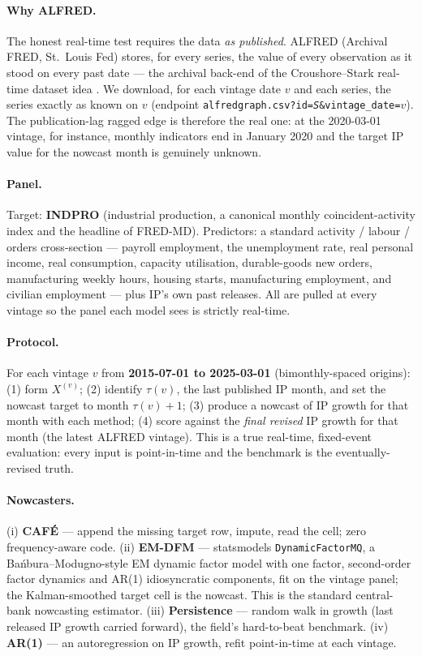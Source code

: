 \documentclass[11pt]{article}
\newcommand{\cafe}{CAF\'E}
\begin{document}
\paragraph{Why ALFRED.} The honest real-time test requires the data \emph{as published}.
ALFRED (Archival FRED, St.\ Louis Fed) stores, for every series, the value of every
observation as it stood on every past date --- the archival back-end of the
Croushore--Stark real-time dataset idea \cite{croushore2001realtime}. We download, for
each vintage date $v$ and each series, the series exactly as known on $v$ (endpoint
\texttt{alfredgraph.csv?id=\textit{S}\&vintage\_date=$v$}). The publication-lag ragged edge
is therefore the real one: at the 2020-03-01 vintage, for instance, monthly indicators end
in January 2020 and the target IP value for the nowcast month is genuinely unknown.

\paragraph{Panel.} Target: \textbf{INDPRO} (industrial production, a canonical monthly
coincident-activity index and the headline of FRED-MD). Predictors: a standard activity /
labour / orders cross-section --- payroll employment, the unemployment rate, real personal
income, real consumption, capacity utilisation, durable-goods new orders, manufacturing
weekly hours, housing starts, manufacturing employment, and civilian employment --- plus
IP's own past releases. All are pulled at every vintage so the panel each model sees is
strictly real-time.

\paragraph{Protocol.} For each vintage $v$ from \textbf{2015-07-01 to 2025-03-01} (bimonthly-spaced
origins): (1) form $X^{(v)}$; (2) identify $\tau(v)$, the last published IP month, and set
the nowcast target to month $\tau(v)+1$; (3) produce a nowcast of IP growth for that month
with each method; (4) score against the \emph{final revised} IP growth for that month
(the latest ALFRED vintage). This is a true real-time, fixed-event evaluation: every input
is point-in-time and the benchmark is the eventually-revised truth.

\paragraph{Nowcasters.} (i) \textbf{\cafe{}} --- append the missing target row, impute,
read the cell; zero frequency-aware code. (ii) \textbf{EM-DFM} --- statsmodels
\texttt{DynamicFactorMQ}, a Ba\'nbura--Modugno-style EM dynamic factor model with one
factor, second-order factor dynamics and AR(1) idiosyncratic components, fit on the
vintage panel; the Kalman-smoothed target cell is the nowcast. This is the standard
central-bank nowcasting estimator. (iii) \textbf{Persistence} --- random walk in growth
(last released IP growth carried forward), the field's hard-to-beat benchmark. (iv)
\textbf{AR(1)} --- an autoregression on IP growth, refit point-in-time at each vintage.
\end{document}
